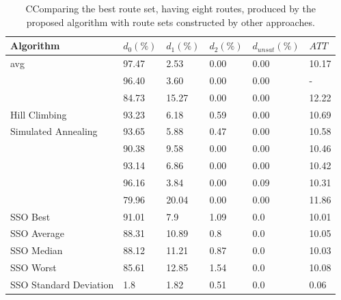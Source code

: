     \begin{table}[H]
    \centering
    \hspace*{-1.0cm}
    \begin{tabular}{|l||l|l|l|l|l|}
    \hline
    Algorithm & $d_0(\%)$ & $d_1(\%)$ & $d_2(\%)$ & $d_{unsat}(\%)$ & $ATT$ \\
    \hline
    \citet{kechagiopoulos14} avg & 97.47 & 2.53 & 0.00 & 0.00 & 10.17 \\
    \citet{nikolic14} & 96.40 & 3.60 & 0.00 & 0.00 & - \\
    \citet{kidwai98} & 84.73 & 15.27 & 0.00 & 0.00 & 12.22 \\
    \citet{fan09} Hill Climbing & 93.23 & 6.18 & 0.59 & 0.00 & 10.69 \\
    \citet{fan09} Simulated Annealing & 93.65 & 5.88 & 0.47 & 0.00 & 10.58 \\
    \citet{chakroborty02} & 90.38 & 9.58 & 0.00 & 0.00 & 10.46 \\
    \citet{zhang10} & 93.14 & 6.86 & 0.00 & 0.00 & 10.42 \\
    \citet{chew12} & 96.16 & 3.84 & 0.00 & 0.09 & 10.31 \\
    \citet{baaj91} & 79.96 & 20.04 & 0.00 & 0.00 & 11.86 \\
    \hline
    \hline
    SSO Best & 91.01 & 7.9 & 1.09 & 0.0 & 10.01\\
    SSO Average & 88.31 & 10.89 & 0.8 & 0.0 & 10.05\\
    SSO Median & 88.12 & 11.21 & 0.87 & 0.0 & 10.03\\
    SSO Worst & 85.61 & 12.85 & 1.54 & 0.0 & 10.08\\
    SSO Standard Deviation & 1.8 & 1.82 & 0.51 & 0.0 & 0.06\\
    \hline
    \end{tabular}
    \caption {CComparing the best route set, having eight routes, produced by the proposed algorithm with route sets constructed by other approaches.}
    \label{table:performanceComparison_8}
    \end{table}


